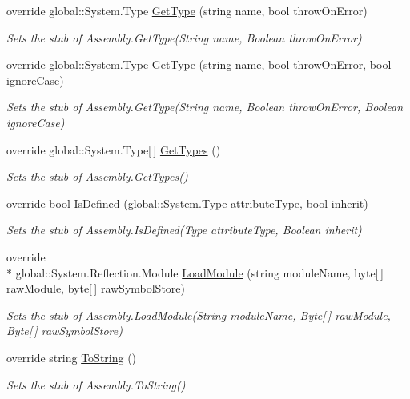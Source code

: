 \begin{DoxyCompactItemize}
override global\-::\-System.\-Type \hyperlink{class_system_1_1_reflection_1_1_fakes_1_1_stub_assembly_ab323a0b57b01aa1cd1a9bf6cb3aeea46}{Get\-Type} (string name, bool throw\-On\-Error)
\begin{DoxyCompactList}\small\item\em Sets the stub of Assembly.\-Get\-Type(\-String name, Boolean throw\-On\-Error)\end{DoxyCompactList}\item 
override global\-::\-System.\-Type \hyperlink{class_system_1_1_reflection_1_1_fakes_1_1_stub_assembly_a2aa73a81d0207759dc21472f6fd2ad3d}{Get\-Type} (string name, bool throw\-On\-Error, bool ignore\-Case)
\begin{DoxyCompactList}\small\item\em Sets the stub of Assembly.\-Get\-Type(\-String name, Boolean throw\-On\-Error, Boolean ignore\-Case)\end{DoxyCompactList}\item 
override global\-::\-System.\-Type\mbox{[}$\,$\mbox{]} \hyperlink{class_system_1_1_reflection_1_1_fakes_1_1_stub_assembly_ac5a1ed9e37b2258374d74b3838f67afc}{Get\-Types} ()
\begin{DoxyCompactList}\small\item\em Sets the stub of Assembly.\-Get\-Types()\end{DoxyCompactList}\item 
override bool \hyperlink{class_system_1_1_reflection_1_1_fakes_1_1_stub_assembly_a49944af4957012eb0bed298a2ad6a6e0}{Is\-Defined} (global\-::\-System.\-Type attribute\-Type, bool inherit)
\begin{DoxyCompactList}\small\item\em Sets the stub of Assembly.\-Is\-Defined(\-Type attribute\-Type, Boolean inherit)\end{DoxyCompactList}\item 
override \\*
global\-::\-System.\-Reflection.\-Module \hyperlink{class_system_1_1_reflection_1_1_fakes_1_1_stub_assembly_a48df90e6765ad594f4827110d6a04c3a}{Load\-Module} (string module\-Name, byte\mbox{[}$\,$\mbox{]} raw\-Module, byte\mbox{[}$\,$\mbox{]} raw\-Symbol\-Store)
\begin{DoxyCompactList}\small\item\em Sets the stub of Assembly.\-Load\-Module(\-String module\-Name, Byte\mbox{[}$\,$\mbox{]} raw\-Module, Byte\mbox{[}$\,$\mbox{]} raw\-Symbol\-Store)\end{DoxyCompactList}\item 
override string \hyperlink{class_system_1_1_reflection_1_1_fakes_1_1_stub_assembly_a7752555ad643de17ac1f424d2defb8a9}{To\-String} ()
\begin{DoxyCompactList}\small\item\em Sets the stub of Assembly.\-To\-String()\end{DoxyCompactList}\end{DoxyCompactItemize}
